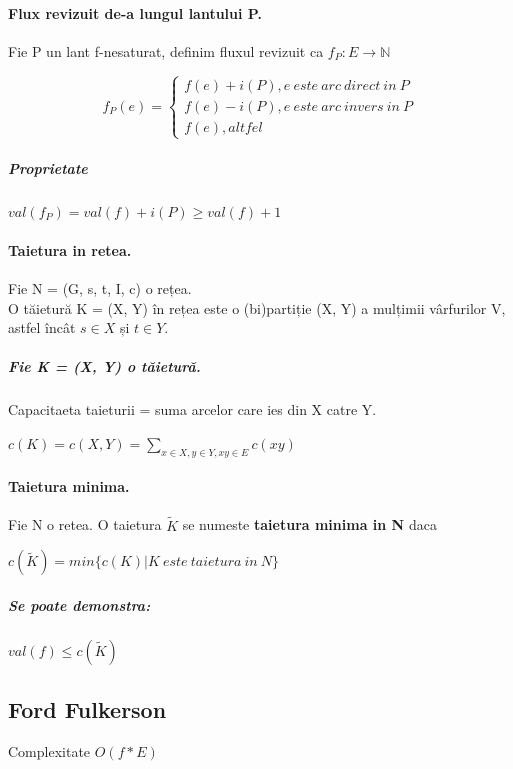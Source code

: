 \documentclass{article}
\begin{document}
\paragraph*{Flux revizuit de-a lungul lantului P.} Fie P un lant f-nesaturat, definim fluxul revizuit ca $f_P : E \to \mathbb{N}$
\begin{center}
    \[
        f_P(e) = \left\{
        \begin{array}{ll}
            f(e) + i(P), e \ este \ arc \ direct \ in \ P \\
            f(e) - i(P), e \ este \ arc \ invers \ in \ P \\
            f(e), altfel
        \end{array}
        \right.
    \]
\end{center}
\subparagraph*{Proprietate} $val(f_P) = val(f) + i(P) \geq val(f) + 1$

\paragraph*{Taietura in retea.} Fie N = (G, {s}, {t}, I, c) o rețea.\\
O tăietură K = (X, Y) în rețea este o (bi)partiție (X, Y) a mulțimii vârfurilor V, astfel încât $s \in X$ și $t \in Y$.
\subparagraph*{Fie K = (X, Y) o tăietură.} Capacitaeta taieturii = suma arcelor care ies din X catre Y.
\begin{center}
    $c(K) = c(X, Y) = \sum_{x \in X, y \in Y, xy \in E}c(xy)$
\end{center}

\paragraph*{Taietura minima.} Fie N o retea. O taietura $\widetilde{K}$ se numeste \textbf{taietura minima in N} daca
\begin{center}
    $c(\widetilde{K}) = min \{c(K) | K \ este \ taietura \ in \ N\}$
\end{center}
\subparagraph*{Se poate demonstra: } $val(f) \leq c(\widetilde{K})$

\subsection*{Ford Fulkerson} Complexitate $O(f*E)$
\end{document}
